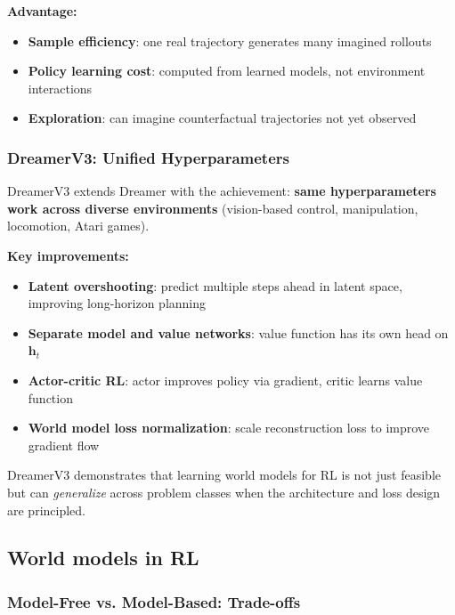 \textbf{Advantage:}
\begin{itemize}
    \item \textbf{Sample efficiency}: one real trajectory generates many imagined rollouts
    \item \textbf{Policy learning cost}: computed from learned models, not environment interactions
    \item \textbf{Exploration}: can imagine counterfactual trajectories not yet observed
\end{itemize}

\subsubsection{DreamerV3: Unified Hyperparameters}

DreamerV3 extends Dreamer with the achievement: \textbf{same hyperparameters work across diverse environments} (vision-based control, manipulation, locomotion, Atari games).

\textbf{Key improvements:}
\begin{itemize}
    \item \textbf{Latent overshooting}: predict multiple steps ahead in latent space, improving long-horizon planning
    \item \textbf{Separate model and value networks}: value function has its own head on $\mathbf{h}_t$
    \item \textbf{Actor-critic RL}: actor improves policy via gradient, critic learns value function
    \item \textbf{World model loss normalization}: scale reconstruction loss to improve gradient flow
\end{itemize}

\begin{notebox}
    DreamerV3 demonstrates that learning world models for RL is not just feasible but can \textit{generalize} across problem classes when the architecture and loss design are principled.
\end{notebox}

\subsection{World models in RL}

\subsubsection{Model-Free vs. Model-Based: Trade-offs}

